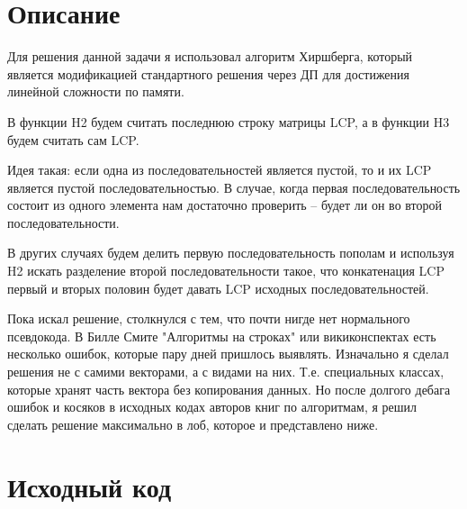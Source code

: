\section{Описание}
Для решения данной задачи я использовал алгоритм Хиршберга, который является модификацией стандартного решения через ДП для достижения линейной сложности по памяти.

В функции H2 будем считать последнюю строку матрицы LCP, а в функции H3 будем считать сам LCP. 

Идея такая: если одна из последовательностей является пустой, то и их LCP является пустой последовательностью. В случае, когда первая последовательность состоит из одного элемента нам достаточно проверить -- будет ли он во второй последовательности.

В других случаях будем делить первую последовательность пополам и используя H2 искать разделение второй последовательности такое, что конкатенация LCP первый и вторых половин будет давать LCP исходных последовательностей.

Пока искал решение, столкнулся с тем, что почти нигде нет нормального псевдокода. В Билле Смите "Алгоритмы на строках" или викиконспектах есть несколько ошибок, которые пару дней пришлось выявлять. Изначально я сделал решения не с самими векторами, а с видами на них. Т.е. специальных классах, которые хранят часть вектора без копирования данных. Но после долгого дебага ошибок и косяков в исходных кодах авторов книг по алгоритмам, я решил сделать решение максимально в лоб, которое и представлено ниже.
\pagebreak

\section{Исходный код}


